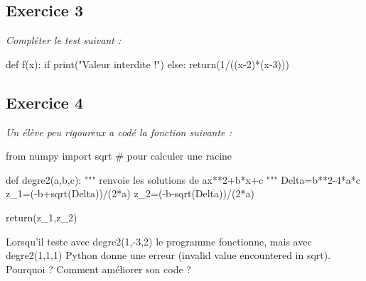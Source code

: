\documentclass[10pt]{article}
\newif\ifprof
\begin{document}
\ifprof
\begin{corrige}
\end{corrige}
\else
\fi

\subsection*{Exercice 3}
\textit{Compléter le test suivant :}
\ifprof
\begin{corrige}
\begin{py}
\begin{python}
def f(x):
    if (x==2 or x==3) # 2 et 3 sont les poles de cette fraction rationnelle. x ne peut pas prendre ces 2 valeurs.
        print("Valeur interdite !")
    else:
        return(1/((x-2)*(x-3)))
\end{python}
\end{py}
\end{corrige}
\else
\begin{py}
\begin{python}
def f(x):
    if 
        print("Valeur interdite !")
    else:
        return(1/((x-2)*(x-3)))
\end{python}
\end{py}
\fi


\subsection*{Exercice 4}
\textit{Un élève peu rigoureux a codé la fonction suivante :}
\begin{python}
from numpy import sqrt # pour calculer une racine

def degre2(a,b,c):
	""" renvoie les solutions de ax**2+b*x+c """
	Delta=b**2-4*a*c
	z_1=(-b+sqrt(Delta))/(2*a)
	z_2=(-b-sqrt(Delta))/(2*a)
	
	return(z_1,z_2)
\end{python} 

Lorsqu'il teste avec degre2(1,-3,2) le programme fonctionne, mais avec degre2(1,1,1) Python donne une erreur (invalid value encountered in sqrt). Pourquoi ? Comment améliorer son code ?



\ifprof
\begin{corrige}
\begin{py}
\begin{python}
from math import sqrt # pour calculer une racine

def degre2(a,b,c):
   """ renvoie les solutions de ax**2+b*x+c """
   Delta=b**2-4*a*c
   if Delta>0:
      z_1=(-b+sqrt(Delta))/(2*a)
      z_2=(-b-sqrt(Delta))/(2*a)
   elif Delta==0:
      z_1=z_2=(-b)/(2*a)
   else:
      z_1=complex(-b/2*a,sqrt(-Delta)/(2*a))
      z_2=complex(-b/2*a,-sqrt(-Delta)/(2*a))
   return(z_1,z_2)
   
print(degre2(1,-3,2))
print(degre2(1,1,1))
\end{python}
\end{py}
\end{corrige}
\else
\fi
\end{document}
